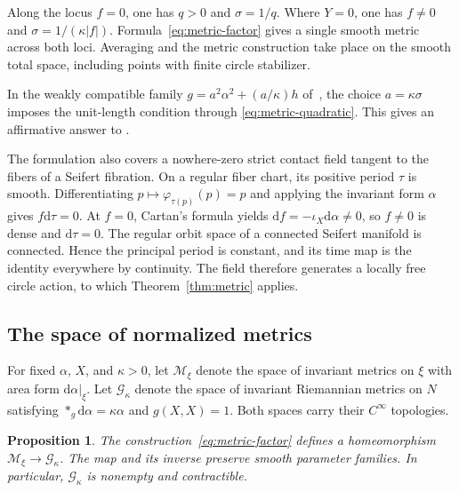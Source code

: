\documentclass[11pt,a4paper]{article}
\numberwithin{equation}{section}
\newtheorem{proposition}[theorem]{Proposition}
\theoremstyle{definition}
\theoremstyle{remark}
\newcommand{\dd}{\mathrm d}
\begin{document}
Along the locus $f=0$, one has $q>0$ and $\sigma=1/q$.
Where $Y=0$, one has $f\ne0$ and $\sigma=1/(\kappa|f|)$.
Formula~\eqref{eq:metric-factor} gives a single smooth metric across both
loci. Averaging and the metric construction take place on the smooth
total space, including points with finite circle stabilizer.

In the weakly compatible family
$g=a^2\alpha^2+(a/\kappa)h$ of~\cite[Proposition 2.1(3)]{EKM}, the
choice $a=\kappa\sigma$ imposes the unit-length condition through
\eqref{eq:metric-quadratic}. This gives an affirmative answer to
\cite[Question 2.7]{Kom}.

The formulation also covers a nowhere-zero strict contact field tangent
to the fibers of a Seifert fibration. On a regular fiber chart, its
positive period $\tau$ is smooth. Differentiating
$p\mapsto\varphi_{\tau(p)}(p)=p$ and applying the invariant form $\alpha$
gives $f\dd\tau=0$. At $f=0$, Cartan's formula yields
$\dd f=-\iota_X\dd\alpha\ne0$, so $f\ne0$ is dense and
$\dd\tau=0$. The regular orbit space of a connected Seifert manifold
is connected. Hence the principal period is constant, and its time map
is the identity everywhere by continuity. The field therefore generates
a locally free circle action, to which Theorem~\ref{thm:metric} applies.

\subsection{The space of normalized metrics}

For fixed $\alpha$, $X$, and $\kappa>0$, let $\mathcal M_\xi$ denote the
space of invariant metrics on $\xi$ with area form $\dd\alpha|_\xi$.
Let $\mathcal G_\kappa$ denote the space of invariant Riemannian metrics
on $N$ satisfying $*_g\dd\alpha=\kappa\alpha$ and $g(X,X)=1$.
Both spaces carry their $C^\infty$ topologies.

\begin{proposition}\label{prop:metric-space}
The construction~\eqref{eq:metric-factor} defines a homeomorphism
$\mathcal M_\xi\to\mathcal G_\kappa$. The map and its inverse preserve
smooth parameter families. In particular, $\mathcal G_\kappa$ is
nonempty and contractible.
\end{proposition}
\end{document}
